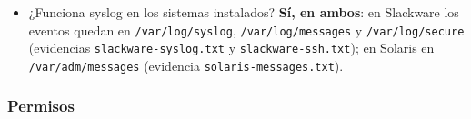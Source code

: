 \documentclass[11pt,a4paper]{report}
\begin{document}
\begin{itemize}
\begin{enumerate}
      \item \textbf{Red (Solaris)}: enlace de red activo --- \texttt{Aug 5 22:05:22 solaris mac: [ID 435574 kern.info] NOTICE: e1000g0 link up, 1000 Mbps, full duplex} (\texttt{lab-evidencias/logs/solaris-messages.txt}).
      \item \textbf{sendmail (Solaris)}: \texttt{Aug 5 22:09:36 solaris sendmail[902]: [ID 702911 mail.crit] My unqualified host name (solaris) unknown; sleeping for retry} (\texttt{lab-evidencias/logs/solaris-messages.txt}).
    \end{enumerate}
  \item ¿Funciona syslog en los sistemas instalados? \textbf{Sí, en ambos}: en Slackware los eventos quedan en \texttt{/var/log/syslog}, \texttt{/var/log/messages} y \texttt{/var/log/secure} (evidencias \texttt{slackware-syslog.txt} y \texttt{slackware-ssh.txt}); en Solaris en \texttt{/var/adm/messages} (evidencia \texttt{solaris-messages.txt}).
\end{itemize}

\subsubsection{Permisos}
\end{document}
